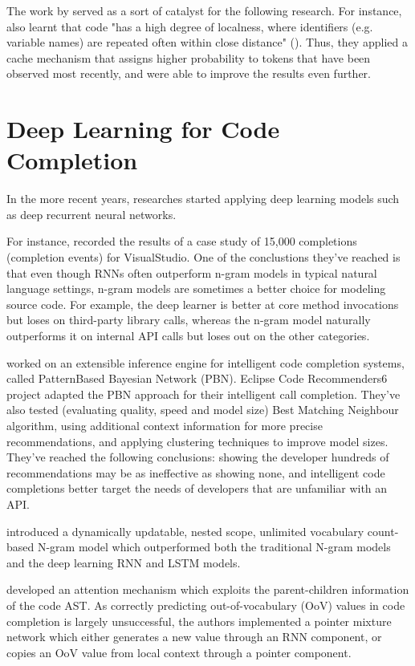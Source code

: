 The work by \cite{Hind12a} served as a sort of catalyst for the following research. For instance, \cite{Tu14a} also learnt that code "has a high degree of localness, where identifiers (e.g. variable names) are repeated often within close distance" (\cite{Alla18a}). Thus, they applied a cache mechanism that assigns higher probability to tokens that have been observed most recently, and were able to improve the results even further. 

\section{Deep Learning for Code Completion}
In the more recent years, researches started applying deep learning models such as deep recurrent neural networks.

For instance, \cite{Hell19a} recorded the results of a case study of 15,000 completions (completion events) for VisualStudio. One of the conclustions they've reached is that even though RNNs often outperform n-gram models in typical natural language settings, n-gram models are sometimes a better choice for modeling source code. For example, the deep learner is better at core method invocations but loses on third-party library calls, whereas the n-gram model naturally outperforms it on internal API calls but loses out on the other categories.

\cite{Prok15a} worked on an extensible inference engine for intelligent code completion systems, called PatternBased Bayesian Network (PBN). Eclipse Code Recommenders6 project adapted the PBN approach for their intelligent call completion. They've also tested (evaluating quality, speed and model size) Best Matching Neighbour algorithm, using additional context information for more precise recommendations, and applying clustering techniques to improve model sizes. They've reached the following conclusions: showing the developer hundreds of recommendations may be as ineffective as showing none, and intelligent code completions better target the needs of developers that are unfamiliar with an API.

\cite{Hell17a} introduced a dynamically updatable, nested scope, unlimited vocabulary count-based N-gram model which outperformed both the traditional N-gram models and the deep learning RNN and LSTM models.

\cite{Li17a} developed an attention mechanism which exploits the parent-children information of the code AST. As correctly predicting out-of-vocabulary (OoV) values in code completion is largely unsuccessful, the authors implemented a pointer mixture network which either generates a new value through an RNN component, or copies an OoV value from local context through a pointer component.

